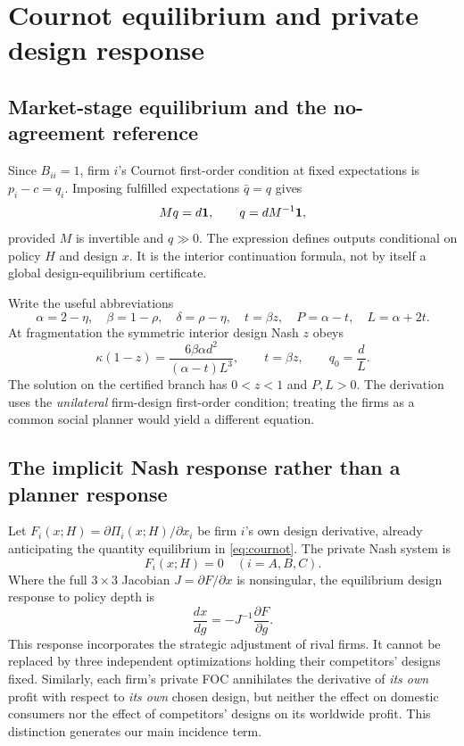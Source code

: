 \documentclass[11pt,a4paper]{article}
\theoremstyle{remark}\newtheorem{remark}[theorem]{Remark}
\begin{document}
\section{Cournot equilibrium and private design response}\label{sec:equilibrium}
\subsection{Market-stage equilibrium and the no-agreement reference}
Since $B_{ii}=1$, firm $i$'s Cournot first-order condition at fixed expectations is $p_i-c=q_i$. Imposing fulfilled expectations $\bar q=q$ gives
\begin{equation}\label{eq:cournot}
M q=d\boldsymbol{1},\qquad q=d M^{-1}\boldsymbol{1},
\end{equation}
provided $M$ is invertible and $q\gg0$. The expression defines outputs conditional on policy $H$ and design $x$. It is the interior continuation formula, not by itself a global design-equilibrium certificate.

Write the useful abbreviations
\begin{equation}\label{eq:abbrev}
\alpha=2-\eta,\quad\beta=1-\rho,\quad\delta=\rho-\eta,\quad
t=\beta z,\quad P=\alpha-t,\quad L=\alpha+2t.
\end{equation}
At fragmentation the symmetric interior design Nash $z$ obeys
\begin{equation}\label{eq:root}
\kappa(1-z)=\frac{6\beta\alpha d^2}{(\alpha-t)L^3},\qquad t=\beta z,\qquad q_0=\frac dL.
\end{equation}
The solution on the certified branch has $0<z<1$ and $P,L>0$. The derivation uses the \emph{unilateral} firm-design first-order condition; treating the firms as a common social planner would yield a different equation.

\subsection{The implicit Nash response rather than a planner response}
Let $F_i(x;H)=\partial\Pi_i(x;H)/\partial x_i$ be firm $i$'s own design derivative, already anticipating the quantity equilibrium in \eqref{eq:cournot}. The private Nash system is
\begin{equation}\label{eq:designFOC}
F_i(x;H)=0\quad (i=A,B,C).
\end{equation}
Where the full $3\times3$ Jacobian $J=\partial F/\partial x$ is nonsingular, the equilibrium design response to policy depth is
\begin{equation}\label{eq:implicit}
\frac{dx}{dg}=-J^{-1}\frac{\partial F}{\partial g}.
\end{equation}
This response incorporates the strategic adjustment of rival firms. It cannot be replaced by three independent optimizations holding their competitors' designs fixed. Similarly, each firm's private FOC annihilates the derivative of \emph{its own} profit with respect to \emph{its own} chosen design, but neither the effect on domestic consumers nor the effect of competitors' designs on its worldwide profit. This distinction generates our main incidence term.
\end{document}
